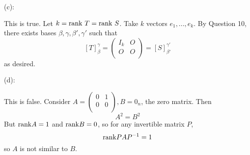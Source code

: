 \documentclass{eh-homework}
\begin{document}
\begin{question}{13}
        \medskip

        (c):

        This is true. Let \(k = \rank \ T = \rank \ S\). Take \(k\) vectors \(e_1, ..., e_k \). By Question 10, there exists bases \(\beta , \gamma , \beta ', \gamma '\) such that
        \[
            [T]_\beta^\gamma = \left(\begin{array}{c|c}
                I_k & O \\
                O & O \\
            \end{array} \right)
            =
            [S]_{\beta'}^{\gamma'}
        \]
        as desired.

        \medskip

        (d):

        This is false. Consider \(A = \begin{pmatrix}
            0 &  1 \\
            0 &  0 \\
        \end{pmatrix},
        B = 0_n\), the zero matrix. Then
        \[
            A^2 = B^2
        \]
        But \(\mathrm{rank} A = 1\) and \(\mathrm{rank} B = 0\), so for any invertible matrix \(P\),
        \[
            \mathrm{rank} PAP^{-1} = 1
        \]
        so \(A\) is not similar to \(B\).
    \end{question}
\end{document}
